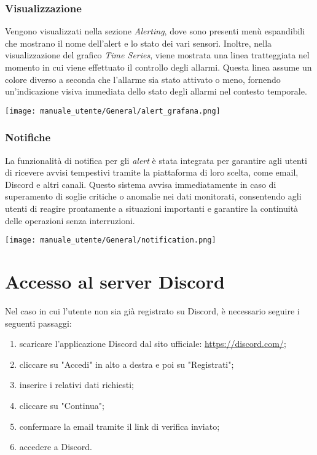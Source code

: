 \subsubsection{Visualizzazione}
Vengono visualizzati nella sezione \textit{Alerting}, dove sono presenti menù espandibili che mostrano il nome dell'alert e lo stato dei vari sensori. Inoltre, nella visualizzazione del grafico \textit{Time Series}, viene mostrata una linea tratteggiata nel momento in cui viene effettuato il controllo degli allarmi. Questa linea assume un colore diverso a seconda che l'allarme sia stato attivato o meno, fornendo un'indicazione visiva immediata dello stato degli allarmi nel contesto temporale.
\begin{center}
    \texttt{[image: manuale\_utente/General/alert\_grafana.png]}
\end{center} 

\subsubsection{Notifiche}
La funzionalità di notifica per gli \textit{alert} è stata integrata per garantire agli utenti di ricevere avvisi tempestivi tramite la piattaforma di loro scelta, come email, Discord e altri canali. Questo sistema avvisa immediatamente in caso di superamento di soglie critiche o anomalie nei dati monitorati, consentendo agli utenti di reagire prontamente a situazioni importanti e garantire la continuità delle operazioni senza interruzioni.
\begin{center}
    \texttt{[image: manuale\_utente/General/notification.png]}
\end{center} 

\newpage
\section{Accesso al server Discord}
Nel caso in cui l'utente non sia già registrato su Discord, è necessario seguire i seguenti passaggi:
\begin{enumerate}
    \item scaricare l'applicazione Discord dal sito ufficiale: \url{https://discord.com/};
    \item cliccare su "Accedi" in alto a destra e poi su "Registrati";
    \item inserire i relativi dati richiesti;
    \item cliccare su "Continua";
    \item confermare la email tramite il link di verifica inviato;
    \item accedere a Discord.
\end{enumerate}

